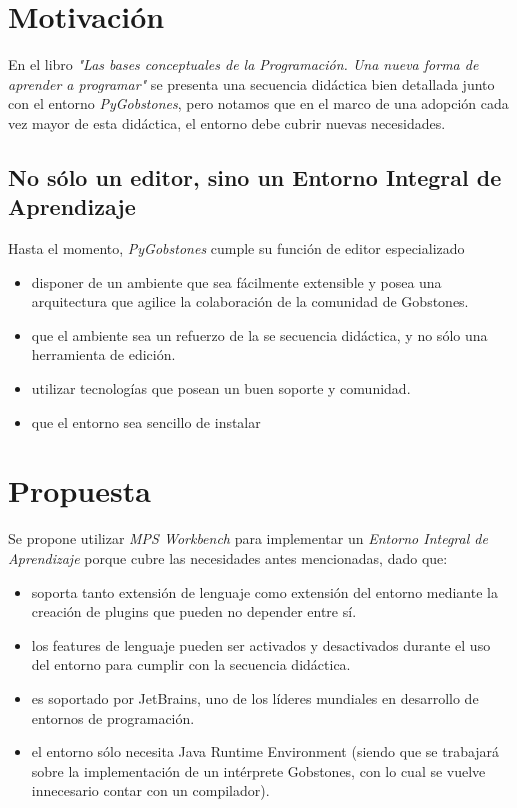 \section{Motivación}

En el libro \textit{"Las bases conceptuales de la Programación. Una nueva forma de aprender a programar"}\cite{Gobstones} se presenta una secuencia didáctica bien detallada junto con el entorno \textit{PyGobstones}\cite{PyGobstones}, pero notamos que en el marco de una adopción cada vez mayor de esta didáctica, el entorno debe cubrir nuevas necesidades.


\subsection{No sólo un editor, sino un Entorno Integral de Aprendizaje}

Hasta el momento, \textit{PyGobstones} cumple su función de editor especializado


\begin{itemize}
  \item disponer de un ambiente que sea fácilmente extensible y posea una arquitectura que agilice la colaboración de la comunidad de Gobstones.
  \item que el ambiente sea un refuerzo de la se secuencia didáctica, y no sólo una herramienta de edición.
  \item utilizar tecnologías que posean un buen soporte y comunidad.
  \item que el entorno sea sencillo de instalar
\end{itemize}


\section{Propuesta}

Se propone utilizar \textit{MPS Workbench} para implementar un \textit{Entorno Integral de Aprendizaje} porque cubre las necesidades antes mencionadas, dado que:

\begin{itemize}
  \item soporta tanto extensión de lenguaje como extensión del entorno mediante la creación de plugins que pueden no depender entre sí.
  \item los features de lenguaje pueden ser activados y desactivados durante el uso del entorno para cumplir con la secuencia didáctica.
  \item es soportado por JetBrains, uno de los líderes mundiales en desarrollo de entornos de programación.
  \item el entorno sólo necesita Java Runtime Environment (siendo que se trabajará sobre la implementación de un intérprete Gobstones, con lo cual se vuelve innecesario contar con un compilador).
\end{itemize}

